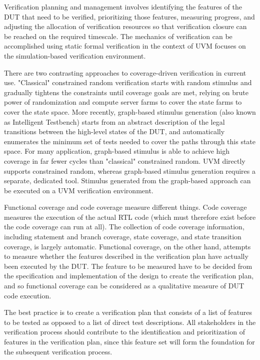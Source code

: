 \documentclass[a4paper,11pt]{article}
\begin{document}
Verification planning and management involves identifying the features of the DUT that need to be verified, prioritizing those features, measuring progress, and adjusting the allocation of verification resources so that verification closure can be reached on the required timescale. The mechanics of verification can be accomplished using static formal verification in the context of UVM focuses on the simulation-based verification environment.

There are two contrasting approaches to coverage-driven verification in current use. "Classical" constrained random verification starts with random stimulus and gradually tightens the constraints until coverage goals are met, relying on brute power of randomization and compute server farms to cover the state farms to cover the state space. More recently, graph-based stimulus generation (also known as Intelligent Testbench) starts from an abstract description of the legal transitions between the high-level states of the DUT, and automatically enumerates the minimum set of tests needed to cover the paths through this state space. For many application, graph-based stimulus is able to achieve high coverage in far fewer cycles than "classical" constrained random. UVM directly supports constrained random, whereas graph-based stimulus generation requires a separate, dedicated tool. Stimulus generated from the graph-based approach can be executed on a UVM verification environment.

Functional coverage and code coverage measure different things. Code coverage measures the execution of the actual RTL code (which must therefore exist before the code coverage can run at all). The collection of code coverage information, including statement and branch coverage, state coverage, and state transition coverage, is largely automatic. Functional coverage, on the other hand, attempts to measure whether the features described in the verification plan have actually been executed by the DUT. The feature to be measured have to be decided from the specification and implementation of the design to create the verification plan, and so functional coverage can be considered as a qualitative measure of DUT code execution. 

The best practice is to create a verification plan that consists of a list of features to be tested as opposed to a list of direct test descriptions. All stakeholders in the verification process should contribute to the identification and prioritization of features in the verification plan, since this feature set will form the foundation for the subsequent verification process.
\end{document}
